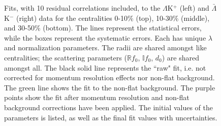 \documentclass[../AnalysisNoteJBuxton.tex]{subfiles}
\renewcommand{\ResNum}{_10Res}
\renewcommand{\SaveNameModLamKch}{\MomRes\NonFlatBgd\ResNum\PrimMaxDecay\ResMethod\ParamFixAndShareLamKch}
\begin{document}
\begin{landscape}
\begin{figure}[h!]
  \centering
  \caption[$\Lambda$K$^{+}$($\bar{\Lambda}$K$^{-}$) Fits with 10 Residuals]{Fits, with 10 residual correlations included, to the $\Lambda$K$^{+}$ (left) and $\bar{\Lambda}$K$^{-}$ (right) data for the centralities 0-10\% (top), 10-30\% (middle), and 30-50\% (bottom).
The lines represent the statistical errors, while the boxes represent the systematic errors.  
Each has unique $\lambda$ and normalization parameters.
The radii are shared amongst like centralities; the scattering parameters ($\mathbb{R}f_{0}$, $\mathbb{I}f_{0}$, $d_{0}$) are shared amongst all.
The black solid line represents the ``raw" fit, i.e. not corrected for momentum resolution effects nor non-flat background.  
The green line shows the fit to the non-flat background.
The purple points show the fit after momentum resolution and non-flat background corrections have been applied.
The initial values of the parameters is listed, as well as the final fit values with uncertainties.}
  \label{fig:LamKchPwConjFits_10Res}
\end{figure}




\end{landscape}
\end{document}
